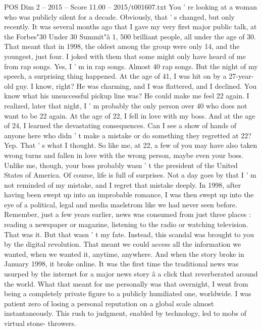\begin{textsample}{POS Dim 2 – 2015 – Score 11.00 – 2015/t001607.txt}  \label{ex:f2_pos_058}
You ' re looking at a woman who was publicly silent for a decade.
Obviously, that ' s changed, but only recently.
It was several months ago that I gave my very first major public talk, at the Forbes"30 Under 30 Summit"â 1, 500 brilliant people, all under the age of 30.
That meant that in 1998, the oldest among the group were only 14, and the youngest, just four.
I joked with them that some might only have heard of me from rap songs.
Yes, I ' m in rap songs.
Almost 40 rap songs.
But the night of my speech, a surprising thing happened.
At the age of 41, I was hit on by a 27-year-old guy.
I know, right?
He was charming, and I was flattered, and I declined.
You know what his unsuccessful pickup line was?
He could make me feel 22 again.
I realized, later that night, I ' m probably the only person over 40 who does not want to be 22 again.
At the age of 22, I fell in love with my boss.
And at the age of 24, I learned the devastating consequences.
Can I see a show of hands of anyone here who didn ' t make a mistake or do something they regretted at 22?
Yep.
That ' s what I thought.
So like me, at 22, a few of you may have also taken wrong turns and fallen in love with the wrong person, maybe even your boss.
Unlike me, though, your boss probably wasn ' t the president of the United States of America.
Of course, life is full of surprises.
Not a day goes by that I ' m not reminded of my mistake, and I regret that mistake deeply.
In 1998, after having been swept up into an improbable romance, I was then swept up into the eye of a political, legal and media maelstrom like we had never seen before.
Remember, just a few years earlier, news was consumed from just three places : reading a newspaper or magazine, listening to the radio or watching television.
That was it.
But that wasn ' t my fate.
Instead, this scandal was brought to you by the digital revolution.
That meant we could access all the information we wanted, when we wanted it, anytime, anywhere.
And when the story broke in January 1998, it broke online.
It was the first time the traditional news was usurped by the internet for a major news story â a click that reverberated around the world.
What that meant for me personally was that overnight, I went from being a completely private figure to a publicly humiliated one, worldwide.
I was patient zero of losing a personal reputation on a global scale almost instantaneously.
This rush to judgment, enabled by technology, led to mobs of virtual stone- throwers.

\end{textsample}
